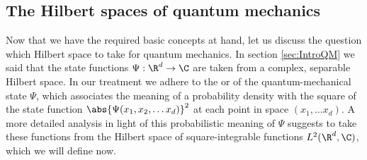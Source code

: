 \subsection{The Hilbert spaces of quantum mechanics}

Now that we have the required basic concepts at hand,
let us discuss the question which Hilbert space to take for quantum mechanics.
In section \ref{sec:IntroQM} we said that the state functions
$\Psi : \R^d \to \C$ are taken from a complex, separable Hilbert space.
In our treatment we adhere to the
 or 
of the quantum-mechanical state $\Psi$,
which associates the meaning of a probability density
with the square
of the state function $\abs{\Psi(x_1, x_2, \ldots x_d)}^2$
at each point in space $(x_1, \ldots x_d)$.
A more detailed analysis in light of this probabilistic meaning of $\Psi$
suggests to take these functions from the Hilbert space of square-integrable functions
$L^2(\R^d, \C)$,
which we will define now.

